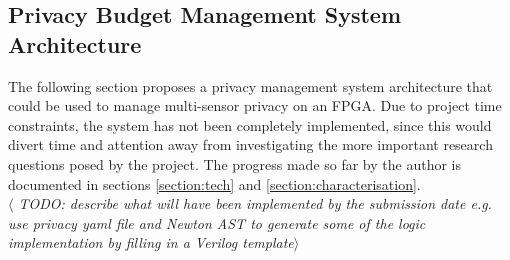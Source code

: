 \documentclass[12pt]{article}
\begin{document}
  \subsection{Privacy Budget Management System Architecture} \label{subsection:privacy_budget_system_arch}
    The following section proposes a privacy management system architecture that could be used to manage multi-sensor privacy on an FPGA. Due to project time constraints, the system has not been completely implemented, since this would divert time and attention away from investigating the more important research questions posed by the project. The progress made so far by the author is documented in sections \ref{section:tech} and \ref{section:characterisation}.
    \\

    \textit{$\langle$ TODO: describe what will have been implemented by the submission date e.g. use privacy yaml file and Newton AST to generate some of the logic implementation by filling in a Verilog template$\rangle$}
    \\
\end{document}
